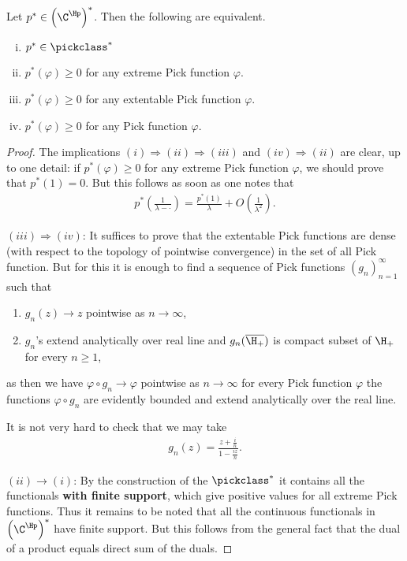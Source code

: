 \begin{lause}\label{pick_functionals}
	Let $p^{*} \in \left(\C^{\Hp}\right)^{*}$. Then the following are equivalent.
	\begin{enumerate}[(i)]
		\item $p^{*} \in \pickclass^{*}$
		\item $p^{*}(\varphi) \geq 0$ for any extreme Pick function $\varphi$.
		\item $p^{*}(\varphi) \geq 0$ for any extentable Pick function $\varphi$.
		\item $p^{*}(\varphi) \geq 0$ for any Pick function $\varphi$.
	\end{enumerate}
\end{lause}
\begin{proof}
	The implications $(i) \Rightarrow (ii) \Rightarrow (iii)$ and $(iv) \Rightarrow (ii)$ are clear, up to one detail: if $p^{*}(\varphi) \geq 0$ for any extreme Pick function $\varphi$, we should prove that $p^{*}(1) = 0$. But this follows as soon as one notes that
	\begin{align*}
		p^{*}\left(\frac{1}{\lambda - \cdot}\right) = \frac{p^{*}\left(1\right)}{\lambda} + O\left(\frac{1}{\lambda^2}\right).
	\end{align*}

	$(iii) \Rightarrow (iv)$: It suffices to prove that the extentable Pick functions are dense (with respect to the topology of pointwise convergence) in the set of all Pick function. But for this it is enough to find a sequence of Pick functions $(g_{n})_{n = 1}^{\infty}$ such that
	\begin{enumerate}
		\item $g_{n}(z) \to z$ pointwise as $n \to \infty$,
		\item $g_{n}$'s extend analytically over real line and $g_{n}(\overline{\H_{+}})$ is compact subset of $\H_{+}$ for every $n \geq 1$,
	\end{enumerate}
	as then we have $\varphi \circ g_{n} \to \varphi$ pointwise as $n \to \infty$ for every Pick function $\varphi$ the functions $\varphi \circ g_{n}$ are evidently bounded and extend analytically over the real line.

	It is not very hard to check that we may take
	\begin{align*}
		g_{n}(z) = \frac{z + \frac{i}{n}}{1 - \frac{i z}{n}}.
	\end{align*}

	$(ii) \rightarrow (i)$: By the construction of the $\pickclass^{*}$ it contains all the functionals \textbf{with finite support}, which give positive values for all extreme Pick functions. Thus it remains to be noted that all the continuous functionals in $\left(\C^{\Hp}\right)^{*}$ have finite support. But this follows from the general fact that the dual of a product equals direct sum of the duals.
\end{proof}

